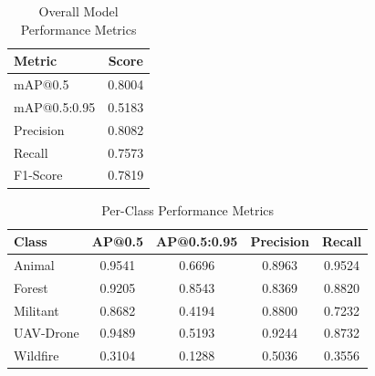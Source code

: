 \begin{table}[htbp]
\caption{Overall Model Performance Metrics}
\label{tab:overall_performance}
\centering
\begin{tabular}{lc}
\hline
\textbf{Metric} & \textbf{Score} \\
\hline
mAP@0.5 & 0.8004 \\
mAP@0.5:0.95 & 0.5183 \\
Precision & 0.8082 \\
Recall & 0.7573 \\
F1-Score & 0.7819 \\
\hline
\end{tabular}
\end{table}

\begin{table}[htbp]
\caption{Per-Class Performance Metrics}
\label{tab:per_class_performance}
\centering
\begin{tabular}{lcccc}
\hline
\textbf{Class} & \textbf{AP@0.5} & \textbf{AP@0.5:0.95} & \textbf{Precision} & \textbf{Recall} \\
\hline
Animal & 0.9541 & 0.6696 & 0.8963 & 0.9524 \\
Forest & 0.9205 & 0.8543 & 0.8369 & 0.8820 \\
Militant & 0.8682 & 0.4194 & 0.8800 & 0.7232 \\
UAV-Drone & 0.9489 & 0.5193 & 0.9244 & 0.8732 \\
Wildfire & 0.3104 & 0.1288 & 0.5036 & 0.3556 \\
\hline
\end{tabular}
\end{table}

